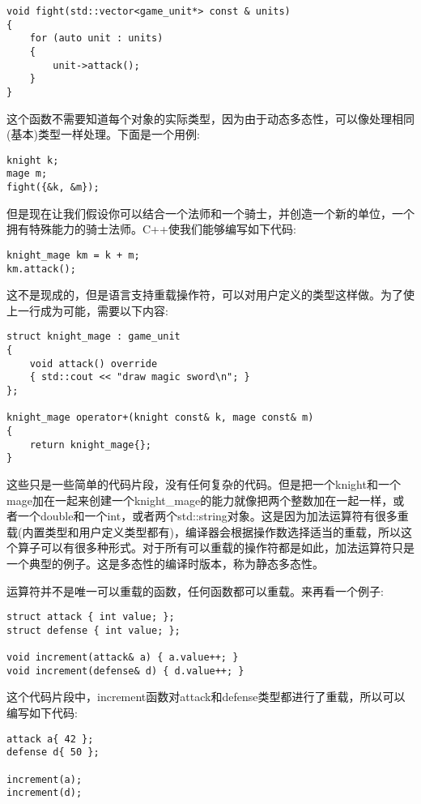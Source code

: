 \begin{lstlisting}[style=styleCXX]
void fight(std::vector<game_unit*> const & units)
{
	for (auto unit : units)
	{
		unit->attack();
	}
}
\end{lstlisting}

这个函数不需要知道每个对象的实际类型，因为由于动态多态性，可以像处理相同(基本)类型一样处理。下面是一个用例:

\begin{lstlisting}[style=styleCXX]
knight k;
mage m;
fight({&k, &m});
\end{lstlisting}

但是现在让我们假设你可以结合一个法师和一个骑士，并创造一个新的单位，一个拥有特殊能力的骑士法师。C++使我们能够编写如下代码:

\begin{lstlisting}[style=styleCXX]
knight_mage km = k + m;
km.attack();
\end{lstlisting}

这不是现成的，但是语言支持重载操作符，可以对用户定义的类型这样做。为了使上一行成为可能，需要以下内容:

\begin{lstlisting}[style=styleCXX]
struct knight_mage : game_unit
{
	void attack() override
	{ std::cout << "draw magic sword\n"; }
};

knight_mage operator+(knight const& k, mage const& m)
{
	return knight_mage{};
}
\end{lstlisting}

这些只是一些简单的代码片段，没有任何复杂的代码。但是把一个knight和一个mage加在一起来创建一个knight\_mage的能力就像把两个整数加在一起一样，或者一个double和一个int，或者两个std::string对象。这是因为加法运算符有很多重载(内置类型和用户定义类型都有)，编译器会根据操作数选择适当的重载，所以这个算子可以有很多种形式。对于所有可以重载的操作符都是如此，加法运算符只是一个典型的例子。这是多态性的编译时版本，称为静态多态性。

运算符并不是唯一可以重载的函数，任何函数都可以重载。来再看一个例子:

\begin{lstlisting}[style=styleCXX]
struct attack { int value; };
struct defense { int value; };

void increment(attack& a) { a.value++; }
void increment(defense& d) { d.value++; }
\end{lstlisting}

这个代码片段中，increment函数对attack和defense类型都进行了重载，所以可以编写如下代码:

\begin{lstlisting}[style=styleCXX]
attack a{ 42 };
defense d{ 50 };

increment(a);
increment(d);
\end{lstlisting}

